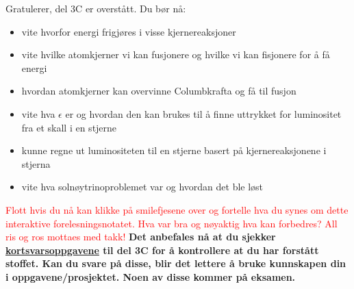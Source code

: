 \documentclass{beamer}
\let\hrefori\href
\renewcommand{\href}[2]{{\setlength{\fboxsep}{1pt}\colorbox{sunset}{\hrefori{#1}{#2}}}}
\newcommand{\pagebutton}[1]{\setbeamertemplate{button}{\tikz\node[inner xsep = 5pt, draw = structure!90, fill = green(ryb), rounded corners = 8pt]{\color{amber}\Large\insertbuttontext};}\beamerbutton{#1}}
\begin{document}
\begin{frame}
\label{oppsummering}
\hyperlink{snp9}{\pagebutton{\small Forrige side}}\href{https://nettskjema.no/a/167466}{ \Changey[1][yellow]{-2}}
Gratulerer, del 3C er overstått. Du bør nå:
\begin{itemize}
\item vite hvorfor energi frigjøres i visse kjernereaksjoner
\item vite hvilke atomkjerner vi kan fusjonere og hvilke vi kan fisjonere for å få energi
\item hvordan atomkjerner kan overvinne Columbkrafta og få til fusjon
\item vite hva $\epsilon$ er og hvordan den kan brukes til å finne uttrykket for luminositet fra et skall i en stjerne
\item kunne regne ut luminositeten til en stjerne basert på kjernereaksjonene i stjerna
\item vite hva solnøytrinoproblemet var og hvordan det ble løst
\end{itemize}
\textcolor{red}{Flott hvis du nå kan klikke på smilefjesene over og fortelle hva du synes om dette interaktive forelesningsnotatet. Hva var bra og nøyaktig hva kan forbedres? All ris og ros mottaes med takk!}
{\bf Det anbefales nå at du sjekker \href{https://www.uio.no/studier/emner/matnat/astro/AST2000/h21/undervisningsmateriell/kortsvarsoppgaver/del3c.pdf}{kortsvarsoppgavene} til del 3C for å kontrollere at du har forstått stoffet. Kan du svare på disse, blir det lettere å bruke kunnskapen din i oppgavene/prosjektet. Noen av disse kommer på eksamen.}
\end{frame}
\end{document}

